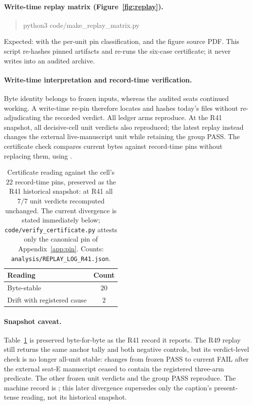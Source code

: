 \documentclass{article}
\begin{document}
\paragraph{Write-time replay matrix (Figure~\ref{fig:replay}).}
\begin{quote}\scriptsize\ttfamily
python3 code/make\_replay\_matrix.py
\end{quote}
Expected:  with the per-unit pin classification, and
the figure source PDF. This script re-hashes pinned artifacts and re-runs the six-case
certificate; it never writes into an audited archive.

\paragraph{Write-time interpretation and record-time verification.}
Byte identity belongs to frozen inputs, whereas the audited seats continued working. A
write-time re-pin therefore locates and hashes today's files without re-adjudicating the
recorded verdict. All ledger arms reproduce. At the R41 snapshot, all decisive-cell unit
verdicts also reproduced; the latest replay instead changes the external live-manuscript
unit while retaining the group PASS. The certificate check compares current bytes against
record-time pins without replacing them, using .

\begin{table}[t]
\caption{Certificate reading against the cell's $22$ record-time pins, preserved as the
R41 historical snapshot: at R41 all $7/7$ unit verdicts recomputed unchanged. The current
divergence is stated immediately below; \texttt{code/verify\_certificate.py} attests only
the canonical pin of Appendix~\ref{app:pin}. Counts: \texttt{analysis/REPLAY\_LOG\_R41.json}.}
\label{tab:anchortally}
\centering
\small
\setlength{\tabcolsep}{8pt}
\begin{tabular}{@{}lc@{}}
\toprule
Reading & Count \\
\midrule
Byte-stable & $20$ \\
Drift with registered cause & $2$ \\
\bottomrule
\end{tabular}
\end{table}

\paragraph{Snapshot caveat.}
Table~\ref{tab:anchortally} is preserved byte-for-byte as the R41 record it reports. The R49
replay still returns the same anchor tally and both negative controls, but its verdict-level
check is no longer all-unit stable:  changes from frozen PASS to current
FAIL after the external seat-E manuscript ceased to contain the registered three-arm predicate.
The other frozen unit verdicts and the group PASS reproduce. The machine record is
; this later divergence supersedes only the caption's
present-tense reading, not its historical snapshot.
\end{document}
